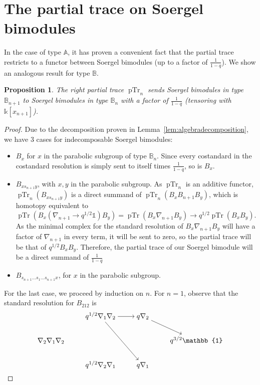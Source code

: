 \documentclass[11pt]{article}
\DeclareMathOperator{\pTr}{pTr}
\newtheorem{proposition}[thm]{Proposition}
\theoremstyle{definition}
\theoremstyle{remark}
\numberwithin{equation}{section}
\begin{document}
\section{The partial trace on Soergel bimodules}
In the case of type $\mathbb{A}$, it has proven a convenient fact that the partial trace
restricts to a functor between Soergel bimodules (up to a factor of
$\frac{1}{1-q}$). We show an analogous result for type $\mathbb{B}$.
\begin{proposition}
	The right partial trace $\pTr_n$ sends Soergel bimodules in type $\mathbb{B}_{n+1}$
	to Soergel bimodules in type
	$\mathbb{B}_n$ with a factor of $\frac{1}{1-q}$ (tensoring with
	$\mathbb{k}[x_{n+1}]$).
\end{proposition}
\begin{proof}
	Due to the decomposition proven in Lemma~\ref{lem:algebradecomposition},
	we have $3$ cases for indecomposable Soergel bimodules:
	\begin{itemize}
		\item $B_x$ for $x$ in the parabolic subgroup of type $\mathbb{B}_n$. Since every
		costandard in the costandard resolution is simply sent to itself
		times $\frac{1}{1-q}$, so is $B_x$.
	\item $B_{xs_{n+1}y}$, with $x,y$ in the parabolic subgroup. As
		$\pTr_n$ is an additive functor, $\pTr_n(B_{xs_{n+1}y})$ is
		a direct summand of
		$\pTr_n(B_xB_{n+1}B_y)$, which is homotopy equivalent to
		\[\pTr(B_x(\nabla_{n+1}\to q^{1/2}\mathbb{1})B_y)
		=\pTr(B_x\nabla_{n+1}B_y) \to q^{1/2}\pTr(B_xB_y).\]
		As the minimal
		complex for the
		standard resolution of $B_x\nabla_{n+1}B_y$ will have
		a factor of $\nabla_{n+1}$ in every term, it will be sent to
		zero, so the partial trace will be that of $q^{1/2}B_xB_y$.
		Therefore, the partial trace of our Soergel bimodule will be
		a direct summand of $\frac{1}{1-q}$ 
	\item $B_{s_{n+1}\dots s_1\dots s_{n+1}x}$, for $x$ in the parabolic
		subgroup.
	\end{itemize}
	For the last case, we proceed by induction on $n$. For $n=1$,
	observe that the standard resolution for $B_{212}$ is
	\[\begin{tikzcd}[ampersand replacement=\&,cramped]
	\& {q^{1/2}\nabla_1\nabla_2} \& {q\nabla_2} \& \\
	{\nabla_{2}\nabla_1\nabla_2} \&\&\& {q^{3/2}\mathbb{1}} \\
	\& {q^{1/2}\nabla_2\nabla_1} \& {q\nabla_1}
	\arrow[from=1-2, to=1-3]
	\arrow[from=1-2, to=3-3]
	\arrow[from=1-3, to=2-4]

\end{tikzcd}\]
\end{proof}
\end{document}
